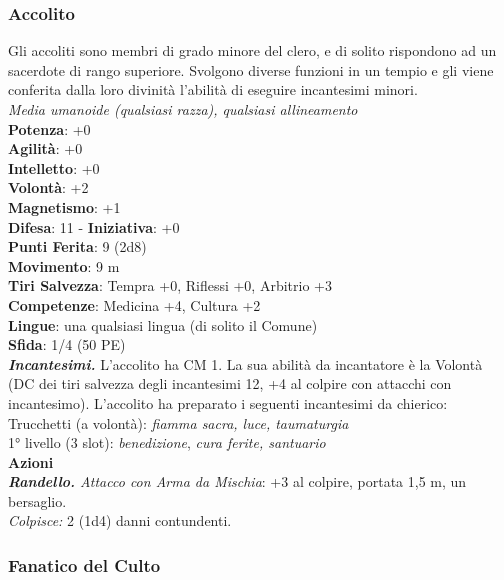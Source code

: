 \begin{multicols}{2}
\subsubsection{Accolito}

Gli accoliti sono membri di grado minore del clero, e di solito rispondono ad un sacerdote di rango superiore. Svolgono diverse funzioni in un tempio e gli viene conferita dalla loro divinità l'abilità di eseguire incantesimi minori.\\
\emph{Media umanoide (qualsiasi razza), qualsiasi allineamento}\\
\textbf{Potenza}: +0\\
\textbf{Agilità}: +0\\
\textbf{Intelletto}: +0\\
\textbf{Volontà}: +2\\
\textbf{Magnetismo}: +1\\
\textbf{Difesa}: 11 - \textbf{Iniziativa}: +0\\
\textbf{Punti Ferita}: 9 (2d8)\\
\textbf{Movimento}: 9 m\\
\textbf{Tiri Salvezza}: Tempra +0, Riflessi +0, Arbitrio +3 \\
\textbf{Competenze}: Medicina +4, Cultura +2\\
\textbf{Lingue}: una qualsiasi lingua (di solito il Comune)\\
\textbf{Sfida}: 1/4 (50 PE)\smallskip\\
\emph{\textbf{Incantesimi.}} L'accolito ha CM 1. La sua abilità da incantatore è la Volontà (DC dei tiri salvezza degli incantesimi 12, +4 al colpire con attacchi con incantesimo). L'accolito ha preparato i seguenti incantesimi da chierico:\\
Trucchetti (a volontà): \emph{fiamma sacra, luce, taumaturgia} \\
1° livello (3 slot): \emph{benedizione}, \emph{cura ferite, santuario}\\
\smallskip\textbf{Azioni}\\
\emph{\textbf{Randello.} Attacco con Arma da Mischia}: +3 al colpire, portata 1,5 m, un bersaglio.\\
\emph{Colpisce:} 2 (1d4) danni contundenti.\\

\subsubsection{Fanatico del Culto}


\end{multicols}
